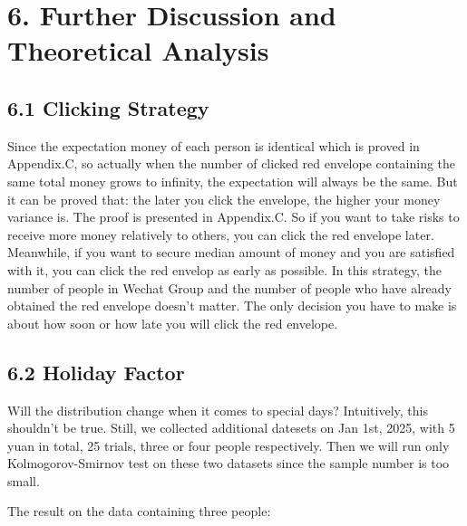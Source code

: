 \documentclass[11pt]{article}
\begin{document}
    \section*{6. Further Discussion and Theoretical Analysis}\label{further-discussion-and-theoretical-analysis}

\subsection*{6.1 Clicking Strategy}\label{clicking-strategy}

Since the expectation money of each person is identical which is proved
in Appendix.C, so actually when the number of clicked red envelope
containing the same total money grows to infinity, the expectation will
always be the same. But it can be proved that: the later you click the
envelope, the higher your money variance is. The proof is presented in
Appendix.C. So if you want to take risks to receive more money
relatively to others, you can click the red envelope later. Meanwhile,
if you want to secure median amount of money and you are satisfied with
it, you can click the red envelop as early as possible. In this
strategy, the number of people in Wechat Group and the number of people
who have already obtained the red envelope doesn't matter. The only
decision you have to make is about how soon or how late you will click
the red envelope.

\subsection*{6.2 Holiday Factor}

Will the distribution change
when it comes to special days? Intuitively, this shouldn't be true.
Still, we collected additional datesets on Jan 1st, 2025, with 5 yuan in
total, 25 trials, three or four people respectively. Then we will run
only Kolmogorov-Smirnov test on these two datasets since the sample
number is too small.

The result on the data containing three people:
\end{document}
